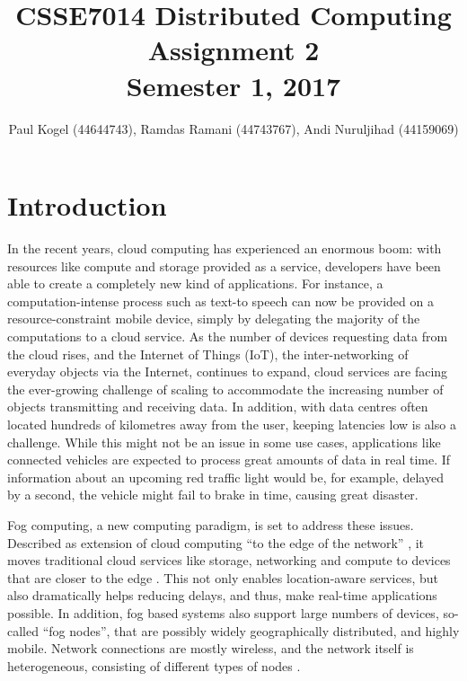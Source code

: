 \documentclass{article}
\title{CSSE7014 Distributed Computing \\
Assignment 2 \\
Semester 1, 2017}
\author{Paul Kogel (44644743), Ramdas Ramani (44743767), Andi Nuruljihad (44159069)}
\begin{document}
\maketitle

\pagebreak
\tableofcontents\thispagestyle{plain}

\pagebreak

\section{Introduction}

In the recent years, cloud computing has experienced an enormous boom: with resources like compute and storage provided as a service, developers have been able to create a completely new kind of applications. For instance, a computation-intense process such as text-to speech can now be provided on a resource-constraint mobile device, simply by delegating the majority of the computations to a cloud service.
%
As the number of devices requesting data from the cloud rises, and the Internet of Things (IoT), the inter-networking of everyday objects via the Internet, continues to expand, cloud services are facing the ever-growing challenge of scaling to accommodate the increasing number of objects transmitting and receiving data. In addition, with data centres often located hundreds of kilometres away from the user, keeping latencies low is also a challenge. While this might not be an issue in some use cases, applications like connected vehicles are expected to process great amounts of data in real time. If information about an upcoming red traffic light would be, for example, delayed by a second, the vehicle might fail to brake in time, causing great disaster. 

Fog computing, a new computing paradigm, is set to address these issues. Described as extension of cloud computing ``to the edge of the network'' \cite{bonomi2012fog}, it moves traditional cloud services like storage, networking and compute to devices that are closer to the edge \cite{cisco2015fogcomputing}. This not only enables location-aware services, but also dramatically helps reducing delays, and thus, make real-time applications possible. In addition, fog based systems also support large numbers of devices, so-called ``fog nodes'', that are possibly widely geographically distributed, and highly mobile. Network connections are mostly wireless, and the network itself is heterogeneous, consisting of different types of nodes \cite{bonomi2012fog}.
\end{document}
